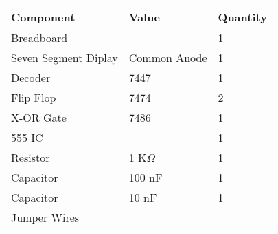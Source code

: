 \begin{tabular}{|l|l|l|}\hline
	Component	&Value &Quantity\\ \hline
	Breadboard & &1 \\ \hline
	Seven Segment Diplay &Common Anode &1 \\ \hline
	Decoder &7447 &1 \\ \hline
	Flip Flop &7474 &2 \\ \hline
	X-OR Gate &7486 &1 \\ \hline
	555 IC & &1 \\ \hline
	Resistor &1 K$\Omega$ &1 \\ \hline
	Capacitor &100 nF &1 \\ \hline
	Capacitor &10 nF &1 \\ \hline
	Jumper Wires & & \\ \hline
\end{tabular}